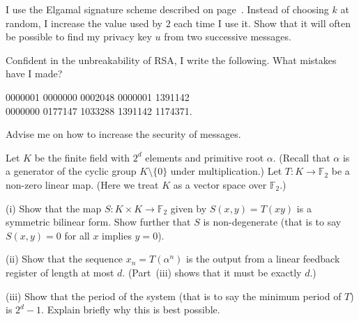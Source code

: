 \begin{question}\label{C4.17}
I use the Elgamal signature scheme
described on page~\pageref{P;Elgamal}. Instead of choosing $k$
at random, I increase the value used by $2$ each time I use it.
Show that it will often be possible to find
my privacy key $u$ from two
successive messages.
\end{question}  
\begin{question}\label{C4.18} 
Confident in the unbreakability of
RSA, I write the following. What mistakes have I made?
\begin{center}
0000001 0000000 0002048 0000001 1391142\\
0000000 0177147 1033288 1391142 1174371.
\end{center}
Advise me on how to increase the security of messages.
\end{question}
\begin{question}\label{E;maximum period}\label{C4.19}
Let $K$ be the finite field with $2^{d}$ elements
and primitive root $\alpha$. (Recall that $\alpha$ is
a generator of the cyclic group $K\setminus\{0\}$
under multiplication.) Let $T:K\rightarrow{\mathbb F}_{2}$
be a non-zero linear map. (Here we treat $K$ as a vector
space over ${\mathbb F}_{2}$.)

(i) Show that the map $S:K\times K \rightarrow{\mathbb F}_{2}$
given by $S(x,y)=T(xy)$ is a symmetric bilinear form.
Show further that $S$ is non-degenerate
(that is to say $S(x,y)=0$ for all $x$ implies $y=0$).

(ii) Show that the sequence $x_{n}=T(\alpha^{n})$
is the output from a linear feedback register of length 
at most $d$. (Part~(iii) shows that it must be exactly $d$.)

(iii) Show that the period of the system (that is to say the minimum
period of $T$) is $2^{d}-1$. Explain briefly why this
is best possible.
\end{question}

